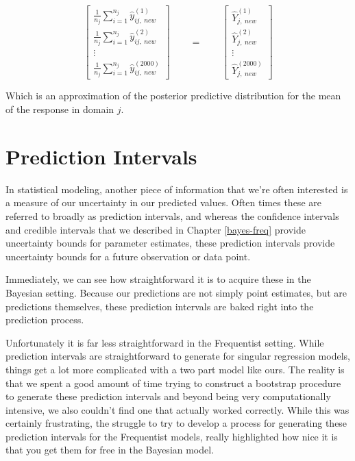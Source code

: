 \documentclass[12pt,twoside]{reedthesis}
\begin{document}
\[
\begin{bmatrix}
\frac{1}{n_j} \sum_{i = 1}^{n_j}\hat{y}_{ij, \ new}^{(1)} \\
\frac{1}{n_j} \sum_{i = 1}^{n_j}\hat{y}_{ij, \ new}^{(2)} \\
\vdots \\
\frac{1}{n_j} \sum_{i = 1}^{n_j}\hat{y}_{ij, \ new}^{(2000)}
\end{bmatrix} \qquad = \qquad 
\begin{bmatrix}
\hat{Y}_{j, \ new}^{(1)} \\
\hat{Y}_{j, \ new}^{(2)} \\
\vdots \\
\hat{Y}_{j, \ new}^{(2000)}
\end{bmatrix}
\]

Which is an approximation of the posterior predictive distribution for the mean of the response in domain \(j\).

\hypertarget{prediction-intervals}{%
\section{Prediction Intervals}\label{prediction-intervals}}

In statistical modeling, another piece of information that we're often interested is a measure of our uncertainty in our predicted values. Often times these are referred to broadly as prediction intervals, and whereas the confidence intervals and credible intervals that we described in Chapter \ref{bayes-freq} provide uncertainty bounds for parameter estimates, these prediction intervals provide uncertainty bounds for a future observation or data point.

Immediately, we can see how straightforward it is to acquire these in the Bayesian setting. Because our predictions are not simply point estimates, but are predictions themselves, these prediction intervals are baked right into the prediction process.

Unfortunately it is far less straightforward in the Frequentist setting. While prediction intervals are straightforward to generate for singular regression models, things get a lot more complicated with a two part model like ours. The reality is that we spent a good amount of time trying to construct a bootstrap procedure to generate these prediction intervals and beyond being very computationally intensive, we also couldn't find one that actually worked correctly. While this was certainly frustrating, the struggle to try to develop a process for generating these prediction intervals for the Frequentist models, really highlighted how nice it is that you get them for free in the Bayesian model.
\end{document}
